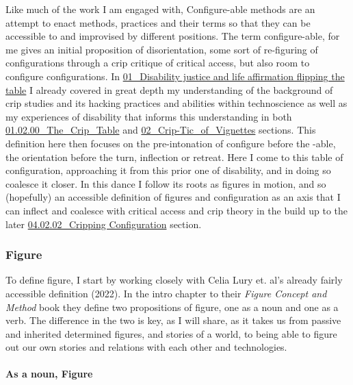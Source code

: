 Like much of the work I am engaged with, Configure-able methods are an
attempt to enact methods, practices and their terms so that they can be
accessible to and improvised by different positions. The term
configure-able, for me gives an initial proposition of disorientation,
some sort of re-figuring of configurations through a crip critique of
critical access, but also room to configure configurations. In
\href{../../01_Disability_justice_and_life_affirmation_flipping_the_table/01_Disability\%20justice\%20and\%20life\%20affirmation\%20flipping\%20the\%20table.md}{01\_Disability
justice and life affirmation flipping the table} I already covered in
great depth my understanding of the background of crip studies and its
hacking practices and abilities within technoscience as well as my
experiences of disability that informs this understanding in both
\href{../../01_Disability_justice_and_life_affirmation_flipping_the_table/sections/01.02.00_The_Crip_Table.md}{01.02.00\_The\_Crip\_Table}
and
\href{../../02_Crip-Tic_of_Vignettes/02_Crip-Tic_of_Vignettes.md}{02\_Crip-Tic\_of\_Vignettes}
sections. This definition here then focuses on the pre-intonation of
configure before the -able, the orientation before the turn, inflection
or retreat. Here I come to this table of configuration, approaching it
from this prior one of disability, and in doing so coalesce it closer.
In this dance I follow its roots as figures in motion, and so
(hopefully) an accessible definition of figures and configuration as an
axis that I can inflect and coalesce with critical access and crip
theory in the build up to the later
\href{04.02.02_Cripping\%20Configuration.md}{04.02.02\_Cripping
Configuration} section.

\hypertarget{figure}{%
\subsubsection[Figure]{\texorpdfstring{\protect\hypertarget{anchor}{}{}Figure}{Figure}}\label{figure}}

To define figure, I start by working closely with Celia Lury et. al's
already fairly accessible definition (2022). In the intro chapter to
their \emph{Figure Concept and Method} book they define two propositions
of figure, one as a noun and one as a verb. The difference in the two is
key, as I will share, as it takes us from passive and inherited
determined figures, and stories of a world, to being able to figure out
our own stories and relations with each other and technologies.

\hypertarget{as-a-noun-figure}{%
\paragraph[As a noun,
Figure]{\texorpdfstring{\protect\hypertarget{anchor}{}{}As a noun,
Figure}{As a noun, Figure}}\label{as-a-noun-figure}}

